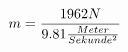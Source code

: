 \documentclass[preview]{standalone}
\begin{document}
\begin{align*}
\special{dvisvgm:raw <g id='unique000'>}m = \frac{1962N}{9.81 \frac{Meter}{Sekunde^{2}}}\special{dvisvgm:raw </g>}
\end{align*}
\end{document}
